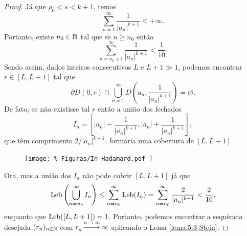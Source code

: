     \begin{proof}
        Já que $\rho_0 < s < k+1$, temos
        \begin{equation*}
            \sum_{n=1}^{\infty} \frac{1}{|a_n|^{k+1}} < +\infty.
        \end{equation*}
        Portanto, existe $n_0\in\mathbb{N}$ tal que se $n\geq n_0$ então
        \begin{equation*}
            \sum_{n = n_0 + 1}^{\infty} \frac{1}{|a_n|^{k+1}} < \frac{1}{10}.
        \end{equation*}
        Sendo assim, dados inteiros consecutivos $L$ e $L+1 \gg 1$, podemos
        encontrar $r\in [L, L+1]$ tal que
        \begin{equation*}
            \partial D(0, r) 
            \cap 
            \bigcup_{n=1}^{\infty} D\left( a_n, \frac{1}{|a_n|^{k+1}} \right)
            =
            \varnothing.
        \end{equation*}
        De fato, se não existisse tal $r$ então a união dos fechados
        \begin{equation*}
            I_n = 
            \left[
            |a_n| - \frac{1}{|a_n|^{k+1}}, |a_n| + \frac{1}{|a_n|^{k+1}}
            \right],
        \end{equation*}
        que têm comprimento $2/|a_n|^{k+1}$, formaria uma cobertura de $[L, L+1]$
        \begin{figure}[H]\centering
            \texttt{[image: \%
                Figuras/In Hadamard.pdf
            ]}
        \end{figure}
        Ora, mas a união dos $I_n$ não pode cobrir $[L, L+1]$ já que
        \begin{align*}
            \mathrm{Leb}\left(
            \bigcup_{n=n_0}^{\infty} I_n
            \right) 
            \leq
            \sum_{n=n_0}^{\infty} \mathrm{Leb}(I_n)
            =
            \sum_{n=n_0}^{\infty} \frac{2}{|a_n|^{k+1}}
            <
            \frac{2}{10},
        \end{align*}
        enquanto que $\mathrm{Leb}([L, L+1]) = 1$. Portanto, podemos encontrar 
        a sequência desejada $(r_n)_{n\in\mathbb{N}}$ com $r_n \xrightarrow{n\to\infty} \infty$
        aplicando o Lema \ref{lema:5.3-Stein}.
    \end{proof}
    
    \medskip
    
